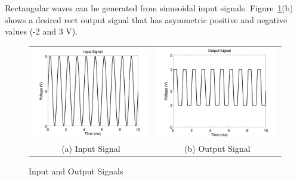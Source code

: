 

%
Rectangular waves can be generated from sinusoidal input signals.
Figure~\ref{fig:sine_rect}(b) shows a desired rect output signal that has
asymmetric positive and negative values (-2 and 3 V).

\begin{figure}[htb!]
    \centering
  \begin{tabular}{cc}
    \includegraphics[width=0.4\linewidth]{sine_to_rect/sine_in.png} &
    \includegraphics[width=0.4\linewidth]{sine_to_rect/rect_out.png} \\
    (a) Input Signal & (b) Output Signal \\
  \end{tabular}
  \caption{Input and Output Signals}
  \label{fig:sine_rect}
\end{figure}

